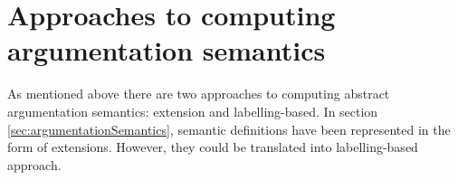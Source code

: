 \section{Approaches to computing argumentation semantics}

As mentioned above there are two approaches to computing abstract argumentation semantics: extension and labelling-based. In section \ref{sec:argumentationSemantics}, semantic definitions have been represented in the form of extensions. However, they could be translated into labelling-based approach.